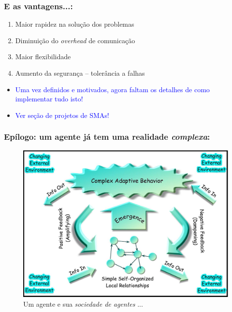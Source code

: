 \begin{frame} %

\frametitle{E as  vantagens...:}

\begin{block}{}
\begin{enumerate}
  \item Maior rapidez na solução dos problemas
  \item Diminuição do \textit{overhead} de comunicação
  \item Maior flexibilidade
  \item Aumento da segurança -- tolerância a falhas
\end{enumerate}

\begin{itemize}
  \item \textcolor{blue}{Uma vez definidos e motivados, agora faltam os detalhes 
de como implementar tudo isto!}

 \item \textcolor{blue}{Ver seção de projetos de SMAs!}

\end{itemize}
\end{block}

\end{frame}



\begin{frame} %

  \frametitle{Epílogo: um agente já tem uma realidade \textit{complexa}:}
        
\begin{figure}[!ht]
\centering
\includegraphics[height =.6\textheight,width=.7\textwidth]{figuras/complex-adaptive-system.jpg}
\caption{Um agente e sua \textit{sociedade de agentes} ...}
\end{figure}
    
\end{frame}








